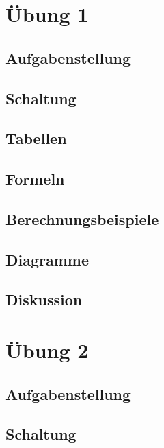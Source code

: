 \documentclass[12pt,a4paper,ngerman]{article}
\begin{document}


%
%

\section{Übung 1}
\subsection{Aufgabenstellung}

\subsection{Schaltung}

 
\subsection{Tabellen}

\subsection{Formeln}

\subsection{Berechnungsbeispiele}

\subsection{Diagramme}


\subsection{Diskussion}




\section{Übung 2}
\subsection{Aufgabenstellung}

\subsection{Schaltung}
\end{document}

